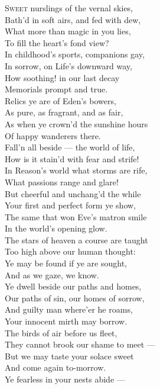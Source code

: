 \textsc{Sweet} nurslings of the vernal skies, \\
 Bath’d in soft airs, and fed with dew, \\
 What more than magic in you lies, \\
 To fill the heart’s fond view? \\
 In childhood’s sports, companions gay, \\
 In sorrow, on Life’s downward way, \\
 How soothing! in our last decay \\
 Memorials prompt and true. \\
  Relics ye are of Eden’s bowers, \\
 As pure, as fragrant, and as fair, \\
 As when ye crown’d the sunshine hours \\
 Of happy wanderers there. \\
 Fall’n all beside — the world of life, \\
 How is it stain’d with fear and strife! \\
 In Reason’s world what storms are rife, \\
 What passions range and glare! \\
  But cheerful and unchang’d the while \\
 Your first and perfect form ye show, \\
 The same that won Eve’s matron smile \\
 In the world’s opening glow. \\
 The stars of heaven a course are taught \\
 Too high above our human thought: \\
 Ye may be found if ye are sought, \\
 And as we gaze, we know. \\
  Ye dwell beside our paths and homes, \\
 Our paths of sin, our homes of sorrow, \\
 And guilty man where’er he roams, \\
 Your innocent mirth may borrow. \\
 The birds of air before us fleet, \\
 They cannot brook our shame to meet — \\
 But we may taste your solace sweet \\
 And come again to-morrow. \\
  Ye fearless in your nests abide — \\
